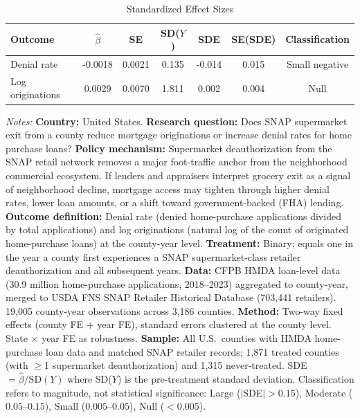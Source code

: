 \begin{table}[htbp]
\centering
\caption{Standardized Effect Sizes}
\label{tab:sde}
\begin{tabular}{lcccccc}
\toprule
Outcome & $\hat{\beta}$ & SE & SD($Y$) & SDE & SE(SDE) & Classification \\
\midrule
Denial rate & -0.0018 & 0.0021 & 0.135 & -0.014 & 0.015 & Small negative \\
Log originations & 0.0029 & 0.0070 & 1.811 & 0.002 & 0.004 & Null \\
\bottomrule
\end{tabular}
\begin{tablenotes}
\item \textit{Notes:} \textbf{Country:} United States. \textbf{Research question:} Does SNAP supermarket exit from a county reduce mortgage originations or increase denial rates for home purchase loans? \textbf{Policy mechanism:} Supermarket deauthorization from the SNAP retail network removes a major foot-traffic anchor from the neighborhood commercial ecosystem. If lenders and appraisers interpret grocery exit as a signal of neighborhood decline, mortgage access may tighten through higher denial rates, lower loan amounts, or a shift toward government-backed (FHA) lending. \textbf{Outcome definition:} Denial rate (denied home-purchase applications divided by total applications) and log originations (natural log of the count of originated home-purchase loans) at the county-year level. \textbf{Treatment:} Binary; equals one in the year a county first experiences a SNAP supermarket-class retailer deauthorization and all subsequent years. \textbf{Data:} CFPB HMDA loan-level data (30.9 million home-purchase applications, 2018--2023) aggregated to county-year, merged to USDA FNS SNAP Retailer Historical Database (703,441 retailers). 19,005 county-year observations across 3,186 counties. \textbf{Method:} Two-way fixed effects (county FE $+$ year FE), standard errors clustered at the county level. State $\times$ year FE as robustness. \textbf{Sample:} All U.S.~counties with HMDA home-purchase loan data and matched SNAP retailer records; 1,871 treated counties (with $\geq$1 supermarket deauthorization) and 1,315 never-treated. SDE $= \hat{\beta} / \text{SD}(Y)$ where SD($Y$) is the pre-treatment standard deviation. Classification refers to magnitude, not statistical significance: Large ($|$SDE$| > 0.15$), Moderate ($0.05$--$0.15$), Small ($0.005$--$0.05$), Null ($< 0.005$).
\end{tablenotes}
\end{table}
